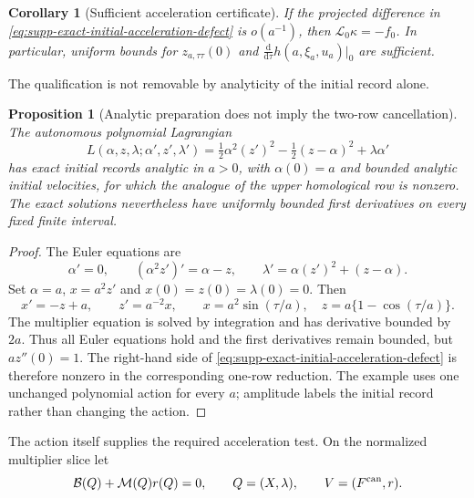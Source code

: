 \documentclass[11pt]{article}
\numberwithin{equation}{section}
\newtheorem{proposition}[proposition]{Proposition}
\newtheorem{corollary}[corollary]{Corollary}
\theoremstyle{definition}
\theoremstyle{remark}
\newcommand{\dd}{\mathrm d}
\begin{document}
\begin{corollary}[Sufficient acceleration certificate]
\label{cor:supp-exact-initial-repair}
If the projected difference in
\eqref{eq:supp-exact-initial-acceleration-defect} is $o(a^{-1})$, then
$\mathcal L_0\kappa=-f_0$.  In particular, uniform bounds for
$z_{a,\tau\tau}(0)$ and
$\frac{\dd}{\dd\tau}h(a,\xi_a,u_a)|_0$ are sufficient.
\end{corollary}

The qualification is not removable by analyticity of the initial record
alone.

\begin{proposition}[Analytic preparation does not imply the two-row cancellation]
\label{prop:supp-exact-initial-counterexample}
The autonomous polynomial Lagrangian
\begin{equation}
 L(\alpha,z,\lambda;\alpha',z',\lambda')
 =\tfrac12\alpha^2(z')^2-\tfrac12(z-\alpha)^2+\lambda\alpha'
 \label{eq:supp-exact-counterexample-L}
\end{equation}
has exact initial records analytic in $a>0$, with $\alpha(0)=a$ and bounded
analytic initial velocities, for which the analogue of the upper homological
row is nonzero.  The exact solutions nevertheless have uniformly bounded
first derivatives on every fixed finite interval.
\end{proposition}

\begin{proof}
The Euler equations are
\[
 \alpha'=0,\qquad (\alpha^2z')'=\alpha-z,\qquad
 \lambda'=\alpha(z')^2+(z-\alpha).
\]
Set $\alpha=a$, $x=a^2z'$ and
$x(0)=z(0)=\lambda(0)=0$.  Then
\begin{equation}
 x'=-z+a,\qquad z'=a^{-2}x,
 \qquad x=a^2\sin(\tau/a),\quad
 z=a\{1-\cos(\tau/a)\}.
 \label{eq:supp-exact-counterexample-solution}
\end{equation}
The multiplier equation is solved by integration and has derivative bounded
by $2a$.  Thus all Euler equations hold and the first derivatives remain
bounded, but $az''(0)=1$.  The right-hand side of
\eqref{eq:supp-exact-initial-acceleration-defect} is therefore nonzero in
the corresponding one-row reduction.  The example uses one unchanged
polynomial action for every $a$; amplitude labels the initial record rather
than changing the action.
\end{proof}

The action itself supplies the required acceleration test.  On the normalized
multiplier slice let
\begin{equation}
 \mathcal B(Q)+\mathcal M(Q)r(Q)=0,
 \qquad Q=(X,\lambda),
 \qquad V=(F^{\rm can},r).
 \label{eq:supp-exact-original-consistency}
\end{equation}
\end{document}
